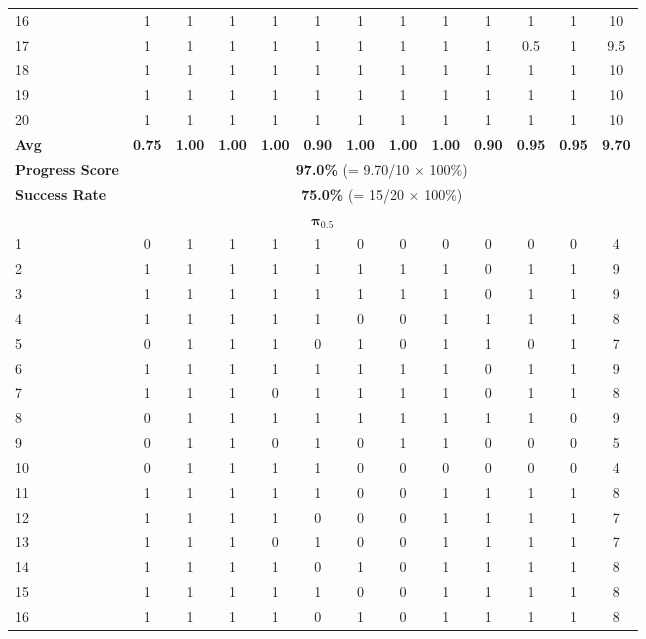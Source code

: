 \documentclass[onecolumn]{robbyant}           %
\begin{document}
\begin{table}[t]
{\begin{tabular}{l|c|cccccccccc|c}
16 & 1 & 1 & 1 & 1 & 1 & 1 & 1 & 1 & 1 & 1 & 1 & 10 \\
17 & 1 & 1 & 1 & 1 & 1 & 1 & 1 & 1 & 1 & 0.5 & 1 & 9.5 \\
18 & 1 & 1 & 1 & 1 & 1 & 1 & 1 & 1 & 1 & 1 & 1 & 10 \\
19 & 1 & 1 & 1 & 1 & 1 & 1 & 1 & 1 & 1 & 1 & 1 & 10 \\
20 & 1 & 1 & 1 & 1 & 1 & 1 & 1 & 1 & 1 & 1 & 1 & 10 \\
\midrule
\textbf{Avg} & \textbf{0.75} & \textbf{1.00} & \textbf{1.00} & \textbf{1.00} & \textbf{0.90} & \textbf{1.00} & \textbf{1.00} & \textbf{1.00} & \textbf{0.90} & \textbf{0.95} & \textbf{0.95} & \textbf{9.70} \\
\textbf{Progress Score} & \multicolumn{12}{c}{\textbf{97.0\%} (= 9.70/10 $\times$ 100\%)} \\
\textbf{Success Rate} & \multicolumn{12}{c}{\textbf{75.0\%} (= 15/20 $\times$ 100\%)} \\
\midrule
\multicolumn{13}{c}{$\boldsymbol{\pi_{0.5}}$} \\
\midrule
1  & 0 & 1 & 1 & 1 & 1 & 0 & 0 & 0 & 0 & 0 & 0 & 4 \\
2  & 1 & 1 & 1 & 1 & 1 & 1 & 1 & 1 & 0 & 1 & 1 & 9 \\
3  & 1 & 1 & 1 & 1 & 1 & 1 & 1 & 1 & 0 & 1 & 1 & 9 \\
4  & 1 & 1 & 1 & 1 & 1 & 0 & 0 & 1 & 1 & 1 & 1 & 8 \\
5  & 0 & 1 & 1 & 1 & 0 & 1 & 0 & 1 & 1 & 0 & 1 & 7 \\
6  & 1 & 1 & 1 & 1 & 1 & 1 & 1 & 1 & 0 & 1 & 1 & 9 \\
7  & 1 & 1 & 1 & 0 & 1 & 1 & 1 & 1 & 0 & 1 & 1 & 8 \\
8  & 0 & 1 & 1 & 1 & 1 & 1 & 1 & 1 & 1 & 1 & 0 & 9 \\
9  & 0 & 1 & 1 & 0 & 1 & 0 & 1 & 1 & 0 & 0 & 0 & 5 \\
10 & 0 & 1 & 1 & 1 & 1 & 0 & 0 & 0 & 0 & 0 & 0 & 4 \\
11 & 1 & 1 & 1 & 1 & 1 & 0 & 0 & 1 & 1 & 1 & 1 & 8 \\
12 & 1 & 1 & 1 & 1 & 0 & 0 & 0 & 1 & 1 & 1 & 1 & 7 \\
13 & 1 & 1 & 1 & 0 & 1 & 0 & 0 & 1 & 1 & 1 & 1 & 7 \\
14 & 1 & 1 & 1 & 1 & 0 & 1 & 0 & 1 & 1 & 1 & 1 & 8 \\
15 & 1 & 1 & 1 & 1 & 1 & 0 & 0 & 1 & 1 & 1 & 1 & 8 \\
16 & 1 & 1 & 1 & 1 & 0 & 1 & 0 & 1 & 1 & 1 & 1 & 8 \\

\end{tabular}}
\end{table}
\end{document}
